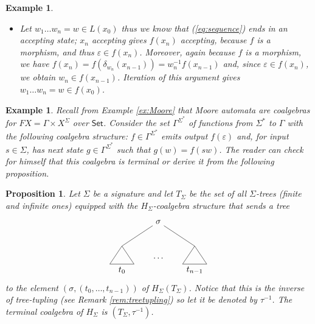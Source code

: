\documentclass[letterpaper, 11pt, oneside]{memoir}
\theoremstyle{myteo}
\newtheorem{proposition}[theorem]{Proposition}
\newtheorem{example}[theorem]{Example}
\numberwithin{equation}{section}
\newcommand{\Set}{\textsf{Set}}
\begin{document}
\begin{example}
\begin{itemize}
    Finally since \(w \in f(x_0)\) we have \(\varepsilon \in f(x_n)\) so \(x_n\) is accepting again because \(f\) is a morphism.
  \item[b.] Let \(w_1\ldots w_n = w \in L(x_0)\) thus we know that (\ref{eq:sequence}) ends in an accepting state; \(x_n\) accepting gives \(f(x_n)\) accepting, because \(f\) is a morphism, and thus \(\varepsilon \in f(x_n)\).
    Moreover, again because \(f\) is a morphism, we have \(f(x_n) = f(\delta_{w_{n}}(x_{n-1})) = w_n^{-1}f(x_{n-1})\) and, since \(\varepsilon \in f(x_n)\), we obtain \(w_n \in f(x_{n-1})\).
    Iteration of this argument gives \(w_1 \ldots w_n = w \in f(x_0)\).
  \end{itemize}
\end{example}

\begin{example}
  Recall from Example \ref{ex:Moore} that Moore automata are coalgebras for \(FX = \Gamma \times X^\Sigma\) over \(\Set\).
  Consider the set \(\Gamma^{\Sigma^*}\) of functions from \(\Sigma^*\) to \(\Gamma\) with the following coalgebra structure: \(f\in \Gamma^{\Sigma^*}\) emits output \(f(\varepsilon)\) and, for input \(s \in \Sigma\), has next state \(g \in \Gamma^{\Sigma^*}\) such that \(g(w) = f(sw)\).
  The reader can check for himself that this coalgebra is terminal or derive it from the following proposition.
\end{example}

\begin{proposition}
  Let \(\Sigma\) be a signature and let \(T_\Sigma\) be the set of all \(\Sigma\)-trees (finite and infinite ones) equipped with the \(H_\Sigma\)-coalgebra structure that sends a tree
  \begin{equation*}
    \begin{tikzpicture}
      \node (t1) at (0,-0.5){\(t_0\)};
      \node (t2) at (1.5,0){\(\ldots\)};
      \node (t3) at (3,-0.5){\(t_{n-1}\)};
      \node (s) at (1.5, 1.5){\(\sigma\)};
      
      \draw[-] (0,0.5) -- (.5, -.25) -- (-.5, -.25) -- (0, .5);
      \draw[-] (3,0.5) -- (3.5, -.25) -- (2.5, -.25) -- (3, .5);

      \draw[-] (s) -- (0,0.5);
      \draw[-] (s) -- (3,0.5);
    \end{tikzpicture}
  \end{equation*}
  to the element \((\sigma, (t_0, \ldots, t_{n-1}))\) of \(H_\Sigma(T_\Sigma)\).
  Notice that this is the inverse of tree-tupling (see Remark \ref{rem:treetupling}) so let it be denoted by \(\tau^{-1}\).
  The terminal coalgebra of \(H_\Sigma\) is \((T_\Sigma, \tau^{-1})\).
\end{proposition}
\end{document}
